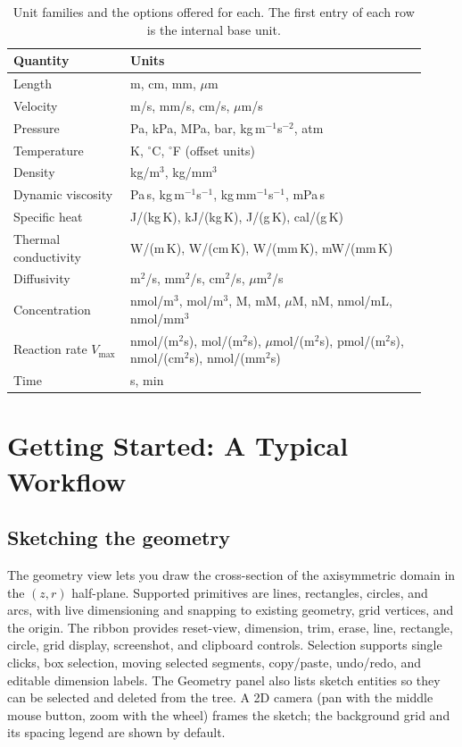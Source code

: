 \documentclass[11pt]{article}
\begin{document}
\begin{table}[h]
\centering
\caption{Unit families and the options offered for each. The first entry of each row is
the internal base unit.}
\label{tab:units}
\begin{tabular}{@{}>{\raggedright\arraybackslash}p{0.26\linewidth}
                   >{\raggedright\arraybackslash}p{0.66\linewidth}@{}}
\toprule
\textbf{Quantity} & \textbf{Units} \\
\midrule
Length            & m, cm, mm, \(\mu\)m \\
Velocity          & m/s, mm/s, cm/s, \(\mu\)m/s \\
Pressure          & Pa, kPa, MPa, bar, kg\,m\(^{-1}\)s\(^{-2}\), atm \\
Temperature       & K, \(^\circ\)C, \(^\circ\)F (offset units) \\
Density           & kg/m\(^3\), kg/mm\(^3\) \\
Dynamic viscosity & Pa\,s, kg\,m\(^{-1}\)s\(^{-1}\), kg\,mm\(^{-1}\)s\(^{-1}\), mPa\,s \\
Specific heat     & J/(kg\,K), kJ/(kg\,K), J/(g\,K), cal/(g\,K) \\
Thermal conductivity & W/(m\,K), W/(cm\,K), W/(mm\,K), mW/(mm\,K) \\
Diffusivity       & m\(^2\)/s, mm\(^2\)/s, cm\(^2\)/s, \(\mu\)m\(^2\)/s \\
Concentration     & nmol/m\(^3\), mol/m\(^3\), M, mM, \(\mu\)M, nM, nmol/mL, nmol/mm\(^3\) \\
Reaction rate \(V_{\max}\) & nmol/(m\(^2\)s), mol/(m\(^2\)s), \(\mu\)mol/(m\(^2\)s), pmol/(m\(^2\)s), nmol/(cm\(^2\)s), nmol/(mm\(^2\)s) \\
Time              & s, min \\
\bottomrule
\end{tabular}
\end{table}

\section{Getting Started: A Typical Workflow}
\subsection{Sketching the geometry}
The geometry view lets you draw the cross-section of the axisymmetric domain in the
\((z, r)\) half-plane. Supported primitives are lines, rectangles, circles, and arcs,
with live dimensioning and snapping to existing geometry, grid vertices, and the origin.
The ribbon provides reset-view, dimension, trim, erase, line, rectangle, circle, grid
display, screenshot, and clipboard controls. Selection supports single clicks, box
selection, moving selected segments, copy/paste, undo/redo, and editable dimension
labels. The Geometry panel also lists sketch entities so they can be selected and
deleted from the tree. A 2D camera (pan with the middle mouse button, zoom with the
wheel) frames the sketch; the background grid and its spacing legend are shown by
default.
\end{document}
